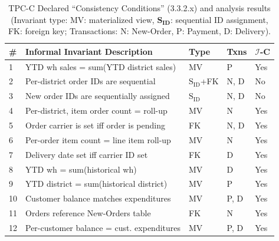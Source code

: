 \begin{table}[t!]
\small
\begin{tabular}{|l|l|l|l|l|}
  \hline
  \textbf{\#} & \textbf{Informal Invariant Description} &
  \textbf{Type} & 
  \textbf{Txns} & \textbf{$\mathcal{I}$-C} \\\hline
  \rowcolor{yesgray}
  1 & {\scriptsize YTD wh sales = sum(YTD district sales)} & MV &
  P & Yes\\
  2 &  {\scriptsize Per-district order IDs are sequential} &$\mathrm{S_{ID}}$+FK  & N, D & No\\
  3 &  {\scriptsize New order IDs are sequentially assigned} & $\mathrm{S_{ID}}$  & N, D & No \\
  \rowcolor{yesgray}
  4 & {\scriptsize  Per-district, item order count = roll-up} & MV &
  N & Yes\\
  \rowcolor{yesgray}
  5 &  {\scriptsize Order carrier is set iff order is pending} & FK &
  N, D & Yes \\
  \rowcolor{yesgray}
  6 &  {\scriptsize Per-order item count = line item roll-up} & MV & N
  & Yes \\
  \rowcolor{yesgray}
  7 &  {\scriptsize Delivery date set iff carrier ID set} & FK & D & Yes \\
  \rowcolor{yesgray}
  8 &  {\scriptsize YTD wh = sum(historical wh)} & MV &
  D & Yes \\
  \rowcolor{yesgray}
  9 &  {\scriptsize YTD district = sum(historical district)} &
  MV & P & Yes \\
  \rowcolor{yesgray}
  10 &  {\scriptsize Customer balance matches expenditures} & MV & P, D & Yes \\
  \rowcolor{yesgray}
  11 &  {\scriptsize Orders reference New-Orders table}  & FK & N & Yes \\
  \rowcolor{yesgray}
  12 &  {\scriptsize Per-customer balance = cust. expenditures} & MV & P, D &
  Yes \\\hline

\end{tabular}
\caption{TPC-C Declared ``Consistency Conditions'' (3.3.2.x) and \iconfluence
  analysis results
  (Invariant type: MV: materialized view, $\mathbf{S_{ID}}$: sequential ID assignment, FK: foreign
  key; Transactions: N: New-Order, P: Payment, D: Delivery).}
\label{table:tpcc-invariants}
\end{table}


